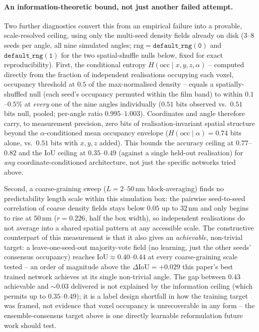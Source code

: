 \documentclass[aip,amsmath,amssymb,reprint]{revtex4-1}
\renewcommand{\ang}{\ensuremath{\alpha}} %
\newcommand{\iou}{\ensuremath{\mathrm{IoU}}}
\begin{document}
\paragraph{An information-theoretic bound, not just another failed attempt.}
Two further diagnostics convert this from an empirical failure into a
provable, scale-resolved ceiling, using only the multi-seed density fields
already on disk (3--8 seeds per angle, all nine simulated angles;
$\mathrm{rng}=\mathtt{default\_rng(0)}$ and $\mathtt{default\_rng(1)}$ for
the two spatial-shuffle nulls below, fixed for exact reproducibility). First,
the conditional entropy $H(\mathrm{occ}\mid x,y,z,\ang)$ -- computed directly
from the fraction of independent realisations occupying each voxel, occupancy
threshold at $0.5$ of the max-normalised density -- equals a
spatially-shuffled null (each seed's occupancy permuted within the film band)
to within $0.1$--$0.5\%$ at \emph{every} one of the nine angles individually
($0.51$ bits observed vs.\ $0.51$ bits null, pooled; per-angle ratio
$0.995$--$1.003$). Coordinates and angle therefore carry, to measurement
precision, zero bits of realisation-invariant spatial structure beyond the
$\ang$-conditioned mean occupancy envelope ($H(\mathrm{occ}\mid\ang)=0.74$
bits alone, vs.\ $0.51$ bits with $x,y,z$ added). This bounds the accuracy
ceiling at $0.77$--$0.82$ and the \iou{} ceiling at $0.35$--$0.49$ (against a
single held-out realisation) for \emph{any} coordinate-conditioned
architecture, not just the specific networks tried above.

Second, a coarse-graining sweep ($L=2$--$50$\,nm block-averaging) finds no
predictability length scale within this simulation box: the pairwise
seed-to-seed correlation of coarse density fields stays below $0.05$ up to
$32$\,nm and only begins to rise at $50$\,nm ($r=0.226$, half the box width),
so independent realisations do not average into a shared spatial pattern at
any accessible scale. The constructive counterpart of this measurement is
that it also gives an \emph{achievable}, non-trivial target: a
leave-one-seed-out majority-vote field (no learning, just the other seeds'
consensus occupancy) reaches $\iou\approx0.40$--$0.44$ at every coarse-graining
scale tested -- an order of magnitude above the $\Delta\iou=+0.029$ this
paper's best trained network achieves at its single non-trivial angle. The
gap between $0.43$ achievable and $\sim\!0.03$ delivered is not explained by
the information ceiling (which permits up to $0.35$--$0.49$); it is a label
design shortfall in how the training target was framed, not evidence that
voxel occupancy is unrecoverable in any form -- the ensemble-consensus
target above is one directly learnable reformulation future work should test.
\end{document}
